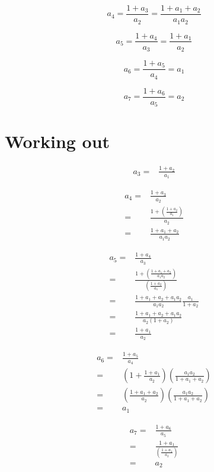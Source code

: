 \documentclass[11pt]{amsart}
\begin{document}
$$
a_{4}
=
\frac{1 + a_{3}}{a_{2}} 
=
\frac{1 + a_{1} + a_{2}}{a_{1} a_{2}}
$$



$$
a_{5}
=
\frac{1 + a_{4}}{a_{3}}
=
\frac{1 + a_{1}}
{a_{2}}
$$

$$
a_{6}
=
\frac{1 + a_{5}}{a_{4}} 
=
a_{1}
$$



$$
a_{7}
=
\frac{1 + a_{6}}{a_{5}} 
=
a_{2}
$$


\section{Working out}


$$
\begin{aligned}
a_{3}
=&
\frac{1 + a_{2}}{a_{1}}
\end{aligned}
$$

$$
\begin{aligned}
a_{4}
=&
\frac{1 + a_{3}}{a_{2}} 
\\
=&
\frac{1 + (\frac{1 + a_{2}}{a_{1}})}{a_{2}} 
\\
=&
\frac{1 + a_{1} + a_{2}}{a_{1} a_{2}}
\end{aligned}
$$

$$
\begin{aligned}
a_{5}
=&
\frac{1 + a_{4}}{a_{3}}
\\
=&
\frac{1 + (\frac{1 + a_{1} + a_{2}}{a_{1} a_{2}})}
{(\frac{1 + a_{2}}{a_{1}})}
\\
=&
\frac{1 + a_{1} + a_{2} + a_{1}a_{2}}{a_{1}a_{2}}
\frac{a_{1}}{1 + a_{2}}
\\=&
\frac{1 + a_{1} + a_{2} + a_{1}a_{2}}
{a_{2} (1+a_{2})}
\\=&
\frac{1 + a_{1}}
{a_{2}}
\end{aligned}
$$

$$
\begin{aligned}
a_{6}
=&
\frac{1 + a_{5}}{a_{4}} 
\\
=&
\left(
1 + 
\frac{1 + a_{1}}
{a_{2}}
\right)
\left(
\frac{a_{1} a_{2}}{1 + a_{1} + a_{2}}
\right)
\\
=&
\left(
\frac{1 + a_{1} + a_{2}}{ a_{2} }
\right)
\left(
\frac{a_{1} a_{2}}{1 + a_{1} + a_{2}}
\right)
\\
=&
a_{1}
\end{aligned}
$$



$$
\begin{aligned}
a_{7}
=&
\frac{1 + a_{6}}{a_{5}} 
\\
=&
\frac{1 + a_{1}}{(\frac{1 + a_{1}}
{a_{2}})}
\\
=&
a_{2}
\end{aligned}
$$
\end{document}
